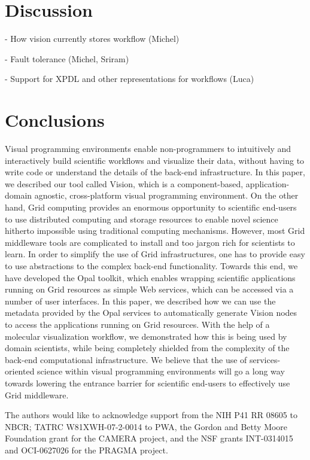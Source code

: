\documentclass[conference]{IEEEtran}
\begin{document}
\section {Discussion}

- How vision currently stores workflow (Michel)

- Fault tolerance (Michel, Sriram)

- Support for XPDL and other representations for workflows (Luca)

\section {Conclusions}

Visual programming environments enable non-programmers to intuitively and
interactively build scientific workflows and visualize their data, without
having to write code or understand the details of the back-end
infrastructure. In this paper, we described our tool called Vision, which
is a component-based, application-domain agnostic, cross-platform visual
programming environment. On the other hand, Grid computing provides an
enormous opportunity to scientific end-users to use distributed computing
and storage resources to enable novel science hitherto impossible using
traditional computing mechanisms. However, most Grid middleware tools are
complicated to install and too jargon rich for scientists to learn. In
order to simplify the use of Grid infrastructures, one has to provide easy
to use abstractions to the complex back-end functionality. Towards this
end, we have developed the Opal toolkit, which enables wrapping scientific
applications running on Grid resources as simple Web services, which can be
accessed via a number of user interfaces. In this paper, we described how
we can use the metadata provided by the Opal services to automatically
generate Vision nodes to access the applications running on Grid resources.
With the help of a molecular visualization workflow, we demonstrated how
this is being used by domain scientists, while being completely shielded
from the complexity of the back-end computational infrastructure. We
believe that the use of services-oriented science within visual programming
environments will go a long way towards lowering the entrance barrier for
scientific end-users to effectively use Grid middleware.

The authors would like to acknowledge support from the NIH P41 RR 08605 to
NBCR; TATRC W81XWH-07-2-0014 to PWA, the Gordon and Betty Moore Foundation
grant for the CAMERA project, and the NSF grants INT-0314015 and
OCI-0627026 for the PRAGMA project. 




\end{document}

